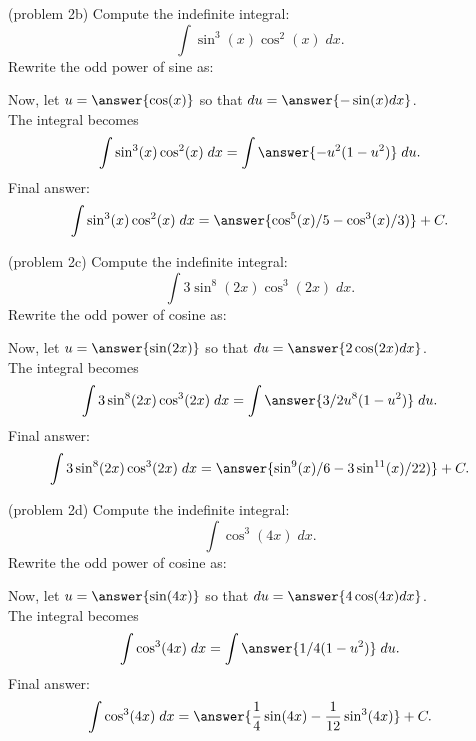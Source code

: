 \documentclass{ximera}
\begin{document}
\begin{problem}(problem 2b)
Compute the indefinite integral:
\[
\int \sin^3(x)\cos^2(x) \; dx.
\]
Rewrite the odd power of sine as:
\begin{multipleChoice}

\end{multipleChoice}

Now, let $u = \answer{\cos(x)}$ so that $du = \answer{-\sin(x) dx}$.\\
The integral becomes
\[
\int \sin^3(x)\cos^2(x) \; dx= \int \answer{-u^2(1-u^2)} \; du.
\]
Final answer:
\[
\int \sin^3(x)\cos^2(x) \; dx= \answer{\cos^5(x)/5 - \cos^3(x)/3)} + C.
\]
\end{problem}



\begin{problem}(problem 2c)
Compute the indefinite integral:
\[
\int 3\sin^8(2x)\cos^3(2x) \; dx.
\]
Rewrite the odd power of cosine as:
\begin{multipleChoice}

\end{multipleChoice}

Now, let $u = \answer{\sin(2x)}$ so that $du = \answer{2\cos(2x) dx}$.\\
The integral becomes
\[
\int 3\sin^8(2x)\cos^3(2x) \; dx= \int \answer{3/2 u^8(1-u^2)} \; du.
\]
Final answer:
\[
\int 3\sin^8(2x)\cos^3(2x) \; dx= \answer{\sin^9(x)/6 - 3 \sin^{11}(x)/22)} + C.
\]
\end{problem}


\begin{problem}(problem 2d)
Compute the indefinite integral:
\[
\int \cos^3(4x) \; dx.
\]
Rewrite the odd power of cosine as:
\begin{multipleChoice}
\end{multipleChoice}

Now, let $u = \answer{\sin(4x)}$ so that $du = \answer{4\cos(4x) dx}$.\\
The integral becomes
\[
\int \cos^3(4x) \; dx= \int \answer{1/4 (1-u^2)} \; du.
\]
Final answer:
\[
\int \cos^3(4x) \; dx= \answer{\frac14 \sin(4x) - \frac{1}{12} \sin^3(4x) } + C.
\]
\end{problem}
\end{document}
